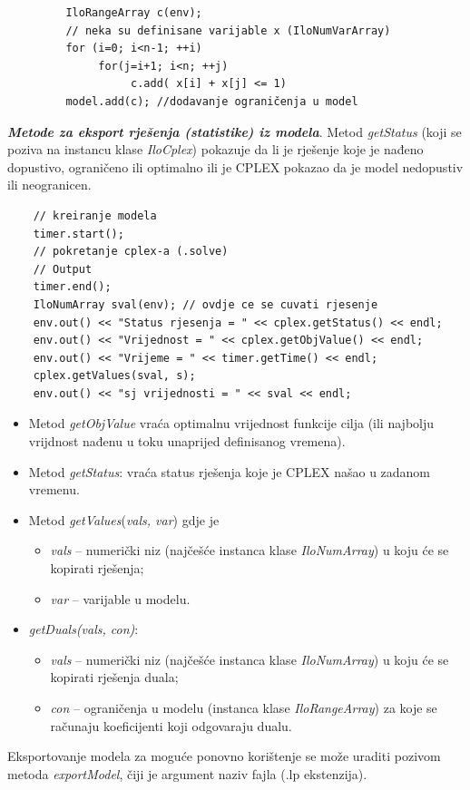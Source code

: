 \documentclass[a4paper, utf8, 11pt, colorlinks]{article}
\begin{document}
 \begin{verbatim}
 	     IloRangeArray c(env);
 	     // neka su definisane varijable x (IloNumVarArray) 
 	     for (i=0; i<n-1; ++i)
 	          for(j=i+1; i<n; ++j)
 	               c.add( x[i] + x[j] <= 1)     
      	 model.add(c); //dodavanje ograničenja u model
 \end{verbatim}
 
 \noindent \textbf{\emph{Metode za eksport rješenja (statistike) iz modela}}. Metod \emph{getStatus} (koji se poziva na instancu klase \emph{IloCplex})  pokazuje da li je rješenje koje je nađeno dopustivo, ograničeno ili optimalno ili je CPLEX pokazao da je model nedopustiv ili neogranicen.
 
 \begin{verbatim}
 	// kreiranje modela 
 	timer.start();
 	// pokretanje cplex-a (.solve)
 	// Output
 	timer.end();
 	IloNumArray sval(env); // ovdje ce se cuvati rjesenje
 	env.out() << "Status rjesenja = " << cplex.getStatus() << endl;
 	env.out() << "Vrijednost = " << cplex.getObjValue() << endl;
 	env.out() << "Vrijeme = " << timer.getTime() << endl;
 	cplex.getValues(sval, s);
 	env.out() << "sj vrijednosti = " << sval << endl;
 \end{verbatim}
\begin{itemize}
	\item Metod \emph{getObjValue} vraća optimalnu vrijednost funkcije cilja (ili najbolju vrijdnost nađenu u toku unaprijed definisanog vremena).
	\item Metod \emph{getStatus}: vraća status rješenja koje je CPLEX našao u zadanom vremenu.
	\item Metod \emph{getValues}(\emph{vals, var}) gdje je 
	\begin{itemize}
	 	  \item \emph{vals} -- numerički niz (najčešće instanca klase \emph{IloNumArray}) u koju će se kopirati rješenja;    
          \item \emph{var} -- varijable u modelu.
    \end{itemize}
     \item \emph{getDuals(vals, con)}:
     \begin{itemize}
     	\item \emph{vals} -- numerički niz (najčešće instanca klase \emph{IloNumArray}) u koju će se kopirati rješenja duala;
     	\item \emph{con} -- ograničenja u modelu (instanca klase \emph{IloRangeArray}) za koje se računaju koeficijenti koji odgovaraju dualu. 
     \end{itemize}
\end{itemize}
Eksportovanje modela za moguće ponovno korištenje se može uraditi pozivom metoda \emph{exportModel}, čiji je argument naziv fajla (.lp ekstenzija).  
\end{document}

